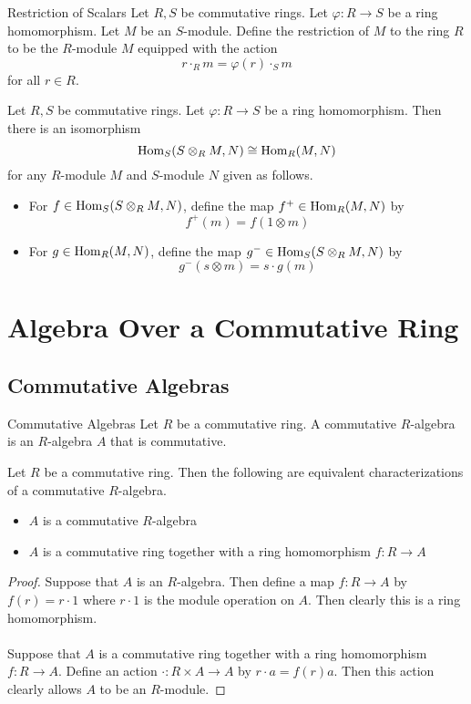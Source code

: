 \documentclass[a4paper]{article}
\begin{document}
\begin{defn}{Restriction of Scalars}{} Let $R,S$ be commutative rings. Let $\varphi:R\to S$ be a ring homomorphism. Let $M$ be an $S$-module. Define the restriction of $M$ to the ring $R$ to be the $R$-module $M$ equipped with the action $$r\cdot_R m=\varphi(r)\cdot_S m$$ for all $r\in R$. 
\end{defn}

\begin{thm}{}{} Let $R,S$ be commutative rings. Let $\varphi:R\to S$ be a ring homomorphism. Then there is an isomorphism $$\operatorname{Hom}_S(S\otimes_R M,N)\cong\operatorname{Hom}_R(M,N)$$ for any $R$-module $M$ and $S$-module $N$ given as follows. 
\begin{itemize}
\item For $f\in\operatorname{Hom}_S(S\otimes_R M,N)$, define the map $f^+\in\operatorname{Hom}_R(M,N)$ by $$f^+(m)=f(1\otimes m)$$
\item For $g\in\operatorname{Hom}_R(M,N)$, define the map $g^-\in\operatorname{Hom}_S(S\otimes_RM,N)$ by $$g^-(s\otimes m)=s\cdot g(m)$$
\end{itemize}
\end{thm}

\pagebreak
\section{Algebra Over a Commutative Ring}
\subsection{Commutative Algebras}
\begin{defn}{Commutative Algebras}{} Let $R$ be a commutative ring. A commutative $R$-algebra is an $R$-algebra $A$ that is commutative. 
\end{defn}

\begin{prp}{}{} Let $R$ be a commutative ring. Then the following are equivalent characterizations of a commutative $R$-algebra. 
\begin{itemize}
\item $A$ is a commutative $R$-algebra
\item $A$ is a commutative ring together with a ring homomorphism $f:R\to A$
\end{itemize}\tcbline
\begin{proof}
Suppose that $A$ is an $R$-algebra. Then define a map $f:R\to A$ by $f(r)=r\cdot 1$ where $r\cdot 1$ is the module operation on $A$. Then clearly this is a ring homomorphism. \\~\\
Suppose that $A$ is a commutative ring together with a ring homomorphism $f:R\to A$. Define an action $\cdot:R\times A\to A$ by $r\cdot a=f(r)a$. Then this action clearly allows $A$ to be an $R$-module. 
\end{proof}
\end{prp}
\end{document}
